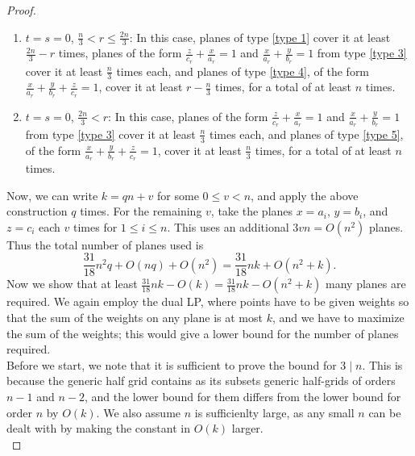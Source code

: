 \documentclass[usenames,dvipsnames, 11pt]{article}
\numberwithin{thm}{section}
\theoremstyle{definition}
\theoremstyle{definition}
\theoremstyle{definition}
\newcommand{\1}{\mathbf{1}}
\begin{document}
\begin{proof}
\begin{enumerate}
    \item $t = s = 0$, $\frac{n}{3} < r \leq \frac{2n}{3}$: In this case, planes of type \ref{type 1} cover it at least $\frac{2n}{3} - r$ times, planes of the form $\frac{z}{c_r} + \frac{x}{a_r} = 1$ and $\frac{x}{a_r} + \frac{y}{b_r} = 1$ from type \ref{type 3} cover it at least $\frac{n}{3}$ times each, and planes of type \ref{type 4}, of the form $\frac{x}{a_r}+\frac{y}{b_r}+\frac{z}{c_r}=1$, cover it at least $r - \frac{n}{3}$ times, for a total of at least $n$ times.  
    \item $t = s = 0$, $\frac{2n}{3} < r$: In this case, planes of the form $\frac{z}{c_r} + \frac{x}{a_r} = 1$ and $\frac{x}{a_r} + \frac{y}{b_r} = 1$ from type \ref{type 3} cover it at least $\frac{n}{3}$ times each, and planes of type \ref{type 5}, of the form $\frac{x}{a_r}+\frac{y}{b_r}+\frac{z}{c_r}=1$, cover it at least $\frac{n}{3}$ times, for a total of at least $n$ times.
\end{enumerate}

    
    Now, we can write $k=qn+v$ for some $0 \leq v <n$, and apply the above construction $q$ times. For the remaining $v$, take the planes $x=a_i$, $y=b_i$, and $z=c_i$ each $v$ times for $1 \leq i \leq n$. This uses an additional $3vn=O(n^2)$ planes. Thus the total number of planes used is
    $$\frac{31}{18}n^2q+O(nq)+O(n^2)=\frac{31}{18}nk+O(n^2+k).$$
    Now we show that at least $\frac{31}{18}nk-O(k)=\frac{31}{18}nk-O(n^2+k)$ many planes are required. We again employ the dual LP, where points have to be given weights so that the sum of the weights on any plane is at most $k$, and we have to maximize the sum of the weights; this would give a lower bound for the number of planes required. \\

    Before we start, we note that it is sufficient to prove the bound for $3 \mid n$. This is because the generic half grid contains as its subsets generic half-grids of orders $n-1$ and $n-2$, and the lower bound for them differs from the lower bound for order $n$ by $O(k)$. We also assume $n$ is sufficienlty large, as any small $n$ can be dealt with by making the constant in $O(k)$ larger. \\


\end{proof}
\end{document}
